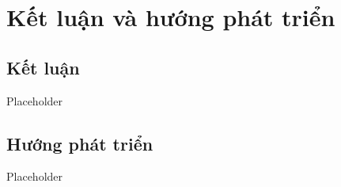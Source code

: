 \chapter{Kết luận và hướng phát triển}
\label{Chapter5}

\section{Kết luận}

Placeholder

\section{Hướng phát triển}

Placeholder